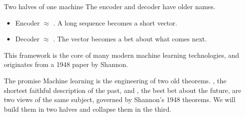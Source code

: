 \begin{frame}{Two halves of one machine}
  The encoder and decoder have older names.

  \medskip
  \begin{itemize}
    \setlength{\itemsep}{0.5em}
    \item Encoder \(\approx\) .
          A long sequence becomes a short vector.
    \item Decoder \(\approx\) .
          The vector becomes a bet about what comes next.
  \end{itemize}

  \medskip
  This framework is the core of many modern machine learning
  technologies, and originates from a 1948 paper by Shannon.
\end{frame}

\begin{frame}{The promise}
  Machine learning is the engineering of two old theorems.
  , the shortest faithful description of
  the past, and , the best bet about the future,
  are two views of the same subject, governed by Shannon's 1948 theorems.
  We will build them in two halves and collapse them in the third.
\end{frame}
